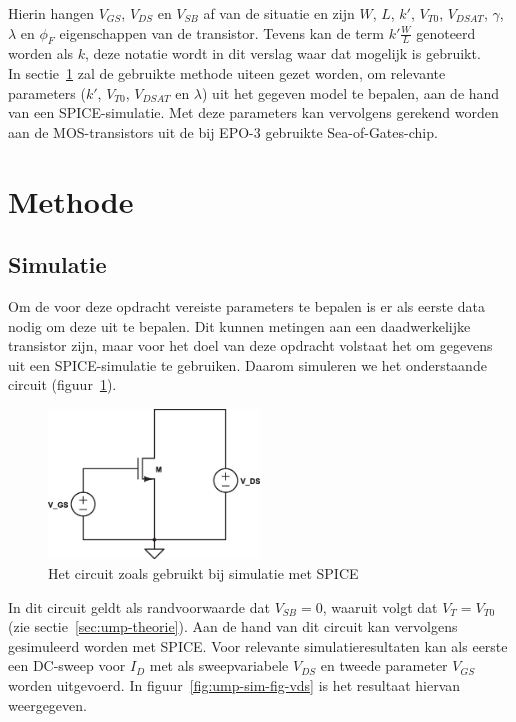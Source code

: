 \documentclass{article}
\begin{document}
Hierin hangen $V_{GS}$, $V_{DS}$ en $V_{SB}$ af van de situatie en zijn $W$, $L$, $k'$, $V_{T0}$, $V_{DSAT}$, $\gamma$, $\lambda$ en $\phi_{F}$ eigenschappen van de transistor. Tevens kan de term $k' \frac{W}{L}$ genoteerd worden als $k$, deze notatie wordt in dit verslag waar dat mogelijk is gebruikt.
\\

In sectie~\ref{sec:ump-methode} zal de gebruikte methode uiteen gezet worden, om relevante parameters ($k'$, $V_{T0}$, $V_{DSAT}$ en $\lambda$) uit het gegeven model te bepalen, aan de hand van een SPICE-simulatie. Met deze parameters kan vervolgens gerekend worden aan de MOS-transistors uit de bij EPO-3 gebruikte Sea-of-Gates-chip.

\section{Methode}
\label{sec:ump-methode}
\subsection{Simulatie}
\label{subsec:ump-methode-sim}

Om de voor deze opdracht vereiste parameters te bepalen is er als eerste data nodig om deze uit te bepalen. Dit kunnen metingen aan een daadwerkelijke transistor zijn, maar voor het doel van deze opdracht volstaat het om gegevens uit een SPICE-simulatie te gebruiken. Daarom simuleren we het onderstaande circuit (figuur~\ref{fig:ump-sim-circuit}).

\begin{figure}[H]
	\centering
	\includegraphics[width=0.5\textwidth]{resource/sim-circuit}
	\caption{Het circuit zoals gebruikt bij simulatie met SPICE}
	\label{fig:ump-sim-circuit}
\end{figure}

In dit circuit geldt als randvoorwaarde dat $V_{SB} = 0$, waaruit volgt dat $V_{T} = V_{T0}$ (zie sectie~\ref{sec:ump-theorie}).
Aan de hand van dit circuit kan vervolgens gesimuleerd worden met SPICE. Voor relevante simulatieresultaten kan als eerste een DC-sweep voor $I_{D}$ met als sweepvariabele $V_{DS}$ en tweede parameter $V_{GS}$ worden uitgevoerd. In figuur~\ref{fig:ump-sim-fig-vds} is het resultaat hiervan weergegeven.
	
\end{document}
